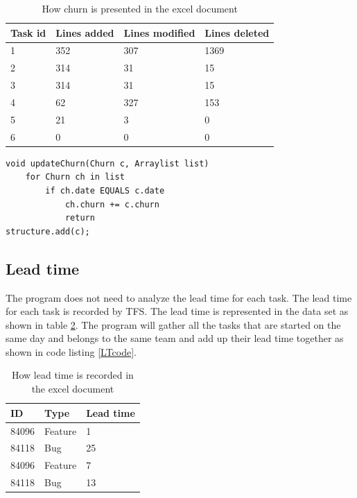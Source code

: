 \documentclass[UKenglish]{ifimaster}  %
\begin{document}
\begin{table}[!ht]
\begin{center}
    \begin{tabular}{| l | l | l | l |}
    \hline
\bf{Task id} & \bf{Lines added} & \bf{Lines modified}  & \bf{Lines deleted} \\ \hline
1&352&307&1369\\ \hline
2&314 & 31 & 15 \\ \hline
3&314&31 & 15\\ \hline
4&62&327&153 \\ \hline
5&21&3&0 \\ \hline
6&0&0&0 \\ \hline
\end{tabular}
\caption{How churn is presented in the excel document}
\label{table:churn} %
\end{center}
\end{table}

\begin{minipage}{\textwidth}
\begin{lstlisting}[caption=Pseudocode example of how throughput is measured, label=churnCode]
void updateChurn(Churn c, Arraylist list)
	for Churn ch in list
		if ch.date EQUALS c.date
			ch.churn += c.churn
			return
structure.add(c);
\end{lstlisting}
 \end{minipage}
 


\subsection{Lead time}
\label{sec:LT}
The program does not need to analyze  the lead time for each task. The lead time for each task is recorded by TFS. The lead time is represented in the data set as shown in table \ref{table:LT}. The program will gather all the tasks that are started on the same day and belongs to the same team and add up their lead time together as shown in code listing \ref{LTcode}.   
\begin{table}[!ht]
\begin{center}
\begin{tabular}{ | l | l | l | }
\hline
	\bf{ID} & \bf{Type} & \bf{Lead time} \\ \hline
	84096 &  Feature  & 1 \\ \hline
	84118 &  Bug  & 25 \\ \hline
	84096 &  Feature  & 7 \\ \hline
	84118 &  Bug  & 13 \\ \hline
\end{tabular}
\caption{How lead time is recorded in the excel document}
\label{table:LT} %
\end{center}
\end{table}
\end{document}

